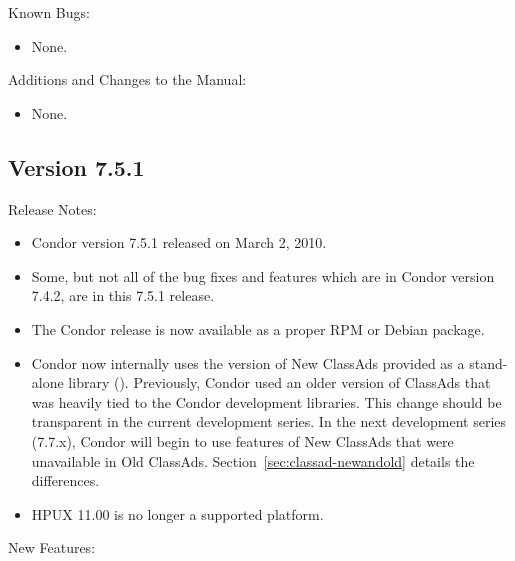 \noindent Known Bugs:

\begin{itemize}

\item None.

\end{itemize}

\noindent Additions and Changes to the Manual:

\begin{itemize}

\item None.

\end{itemize}


\subsection*{\label{sec:New-7-5-1}Version 7.5.1}

\noindent Release Notes:

\begin{itemize}

\item Condor version 7.5.1 released on March 2, 2010.

\item Some, but not all of the bug fixes and features which are in
Condor version 7.4.2, are in this 7.5.1 release.

\item The Condor release is now available as a proper RPM or Debian
package.

\item Condor now internally uses the version of New ClassAds provided
as a stand-alone library ().
Previously, Condor 
used an older version of ClassAds that was heavily tied to the Condor 
development libraries. This change should be transparent in the 
current development series. In the next development series (7.7.x),
Condor  will begin to use features of New ClassAds that were unavailable in 
Old ClassAds. 
Section~\ref{sec:classad-newandold} details the differences.

\item HPUX 11.00 is no longer a supported platform.

\end{itemize}


\noindent New Features:

